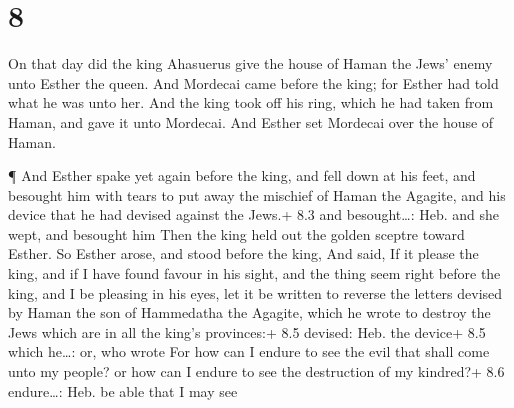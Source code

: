 \hypertarget{section-7}{%
\section{8}\label{section-7}}

 On that day did the king Ahasuerus give the house of Haman
the Jews' enemy unto Esther the queen. And Mordecai came before the
king; for Esther had told what he was unto her.  And the
king took off his ring, which he had taken from Haman, and gave it unto
Mordecai. And Esther set Mordecai over the house of Haman.

 ¶ And Esther spake yet again before the king, and fell down
at his feet, and besought him with tears to put away the mischief of
Haman the Agagite, and his device that he had devised against the Jews.+
8.3 and besought\ldots: Heb. and she wept, and besought him 
Then the king held out the golden sceptre toward Esther. So Esther
arose, and stood before the king,  And said, If it please
the king, and if I have found favour in his sight, and the thing seem
right before the king, and I be pleasing in his eyes, let it be written
to reverse the letters devised by Haman the son of Hammedatha the
Agagite, which he wrote to destroy the Jews which are in all the king's
provinces:+ 8.5 devised: Heb. the device+ 8.5 which he\ldots: or, who
wrote  For how can I endure to see the evil that shall come
unto my people? or how can I endure to see the destruction of my
kindred?+ 8.6 endure\ldots: Heb. be able that I may see

